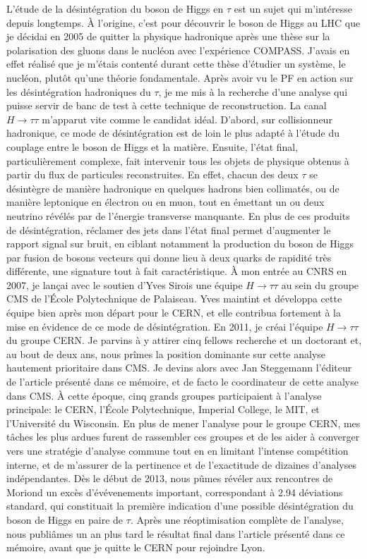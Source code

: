\documentclass[11pt,twoside,a4paper,tdr]{cms-tdr}
\begin{document}
L'étude de la désintégration du boson de Higgs en $\tau$ est un sujet qui m'intéresse depuis longtemps. 
À l'origine, c'est pour découvrir le boson de Higgs au LHC que je décidai en 2005 de quitter la physique hadronique après une thèse sur la polarisation des gluons dans le nucléon avec l'expérience COMPASS.
J'avais en effet réalisé que je m'étais contenté durant cette thèse d'étudier un système, le nucléon, plutôt qu'une théorie fondamentale. 
Après avoir vu le PF en action sur les désintégration hadroniques du $\tau$, 
je me mis à la recherche d'une analyse qui puisse servir de banc de test à cette technique de reconstruction. 
La canal $H \to \tau \tau$ m'apparut vite comme le candidat idéal. 
D'abord, sur collisionneur hadronique, ce mode de désintégration est de loin le plus adapté à l'étude du couplage entre le boson de Higgs et la matière. 
Ensuite, l'état final, particulièrement complexe, fait intervenir tous les objets de physique obtenus à partir du flux de particules reconstruites.
En effet, chacun des deux $\tau$ se désintègre de manière hadronique en quelques hadrons bien collimatés, 
ou de manière leptonique en électron ou en muon, tout en émettant un ou deux neutrino révélés par de l'énergie transverse manquante. 
En plus de ces produits de désintégration, réclamer des jets dans l'état final permet d'augmenter le rapport signal sur bruit, en ciblant notamment la production du boson de Higgs par fusion de bosons vecteurs qui donne lieu à deux quarks de rapidité très différente, une signature tout à fait caractéristique. 
À mon entrée au CNRS en 2007, je lançai avec le soutien d'Yves Sirois une équipe $H \to \tau \tau$ au sein du groupe CMS de l'École Polytechnique de Palaiseau. 
Yves maintint et développa cette équipe bien après mon départ pour le CERN, et elle contribua fortement à la mise en évidence de ce mode de désintégration. 
En 2011, je créai l'équipe $H \to \tau \tau$ du groupe CERN. 
Je parvins à y attirer cinq fellows recherche et un doctorant et, au bout de deux ans, nous prîmes la position dominante sur cette analyse hautement prioritaire dans CMS.
Je devins alors avec Jan Steggemann l'éditeur de l'article présenté dans ce mémoire, 
et de facto le coordinateur de cette analyse dans CMS. 
À cette époque, cinq grands groupes participaient à l'analyse principale: le CERN, l'École Polytechnique, Imperial College, le MIT, et l'Université du Wisconsin.
En plus de mener l'analyse pour le groupe CERN, mes tâches les plus ardues furent de rassembler ces groupes et de les aider à converger vers une stratégie d'analyse commune tout en en limitant l'intense compétition interne, 
et de m'assurer de la pertinence et de l'exactitude de dizaines d'analyses indépendantes.
Dès le début de 2013, nous pûmes révéler aux rencontres de Moriond 
un excès d'évévenements important, correspondant à 2.94 déviations standard, qui constituait la première indication d'une possible désintégration du boson de Higgs en paire de $\tau$. 
Après une réoptimisation complète de l'analyse, nous publiâmes un an plus tard le résultat final dans l'article présenté dans ce mémoire, avant que je quitte le CERN pour rejoindre Lyon.  
\end{document}
